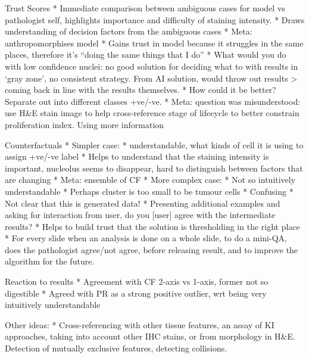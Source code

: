 Trust Scores
* Immediate comparison between ambiguous cases for model vs pathologist self, highlights importance and difficulty of staining intensity.
* Draws understanding of decision factors from the ambiguous cases 
* Meta: anthropomorphises model
* Gains trust in model because it struggles in the same places, therefore it’s “doing the same things that I do”
* What would you do with low confidence nuclei: no good solution for deciding what to with results in ‘gray zone’, no consistent strategy. From AI solution, would throw out results > coming back in line with the results themselves.
* How could it be better?  Separate out into different classes +ve/-ve. 
    * Meta: question was misunderstood: use H&E stain image to help cross-reference stage of lifecycle to better constrain proliferation index. Using more information

Counterfactuals
* Simpler case: 
    * understandable, what kinds of cell it is using to assign +ve/-ve label
    * Helps to understand that the staining intensity is important, nucleolus seems to disappear, hard to distinguish between factors that are changing
        * Meta: ensemble of CF 
* More complex case:
    * Not so intuitively understandable
    * Perhaps cluster is too small to be tumour cells
    * Confusing
* Not clear that this is generated data!
* Presenting additional examples and asking for interaction from user, do you [user] agree with the intermediate results?
* Helps to build trust that the solution is thresholding in the right place
* For every slide when an analysis is done on a whole slide, to do a mini-QA, does the pathologist agree/not agree, before releasing result, and to improve the algorithm for the future.

Reaction to results
* Agreement with CF 2-axis vs 1-axis, former not so digestible
* Agreed with PR as a strong positive outlier, wrt being very intuitively understandable

Other ideas:
* Cross-referencing with other tissue features, an assay of KI approaches, taking into account other IHC stains, or from morphology in H&E. Detection of mutually exclusive features, detecting collisions.

